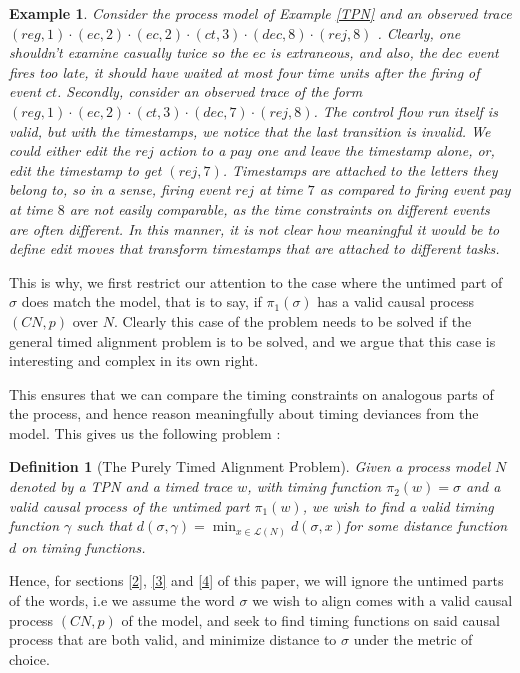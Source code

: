 \documentclass[conference]{IEEEtran}
\newtheorem{definition}{Definition}
\newtheorem{example}{Example}
\begin{document}
\begin{example}
	Consider the process model of Example \ref{TPN} and an observed trace $(reg, 1) \cdot (ec, 2) \cdot (ec, 2) \cdot (ct, 3) \cdot (dec, 8) \cdot (rej, 8)$ . Clearly, one shouldn't examine casually twice so the $ec$ is extraneous, and also, the $dec$ event fires too late, it should have waited at most four time units after the firing of event $ct$. 
	Secondly, consider an observed trace of the form $(reg, 1) \cdot (ec, 2) \cdot (ct, 3) \cdot (dec, 7) \cdot (rej, 8)$. The control flow run itself is valid, but with the timestamps, we notice that the last transition is invalid. We could either edit the $rej$ action to a $pay$ one and leave the timestamp alone, or, edit the timestamp to get $(rej, 7)$. 
	Timestamps are attached to the letters they belong to, so in a sense, firing event $rej$ at time $7$ as compared to firing event $pay$ at time $8$ are not easily comparable, as the time constraints on different events are often different. In this manner, it is not clear how meaningful it would be to define edit moves that transform timestamps that are attached to different tasks. 
\end{example}

This is why, we first restrict our attention to the case where the untimed part of $\sigma$ does match the model, that is to say, if $\pi_1(\sigma)$ has a valid causal process $(CN, p)$ over $N$. Clearly this case of the problem needs to be solved if the general timed alignment problem is to be solved, and we argue that this case is interesting and complex in its own right. 

This ensures that we can compare the timing constraints on analogous parts of the process, and hence reason meaningfully about timing deviances from the model. This gives us the following problem : 

\begin{definition}[The Purely Timed Alignment Problem]
	Given a process model $N$ denoted by a TPN and a timed trace $w$, with timing function $\pi_2(w) = \sigma$ and a valid causal process of the untimed part $\pi_1(w)$, we wish to find a valid timing function $\gamma$ such that $d(\sigma, \gamma) = \min_{x \in \mathcal{L}(N)} d(\sigma, x)$for some distance function $d$ on timing functions. 
	
\end{definition}

Hence, for sections \ref{2}, \ref{3} and \ref{4} of this paper, we will ignore the untimed parts of the words, i.e we assume the word $\sigma$ we wish to align comes with a valid causal process $(CN, p)$ of the model, and seek to find timing functions on said causal process that are both valid, and minimize distance to $\sigma$ under the metric of choice. 
\end{document}
